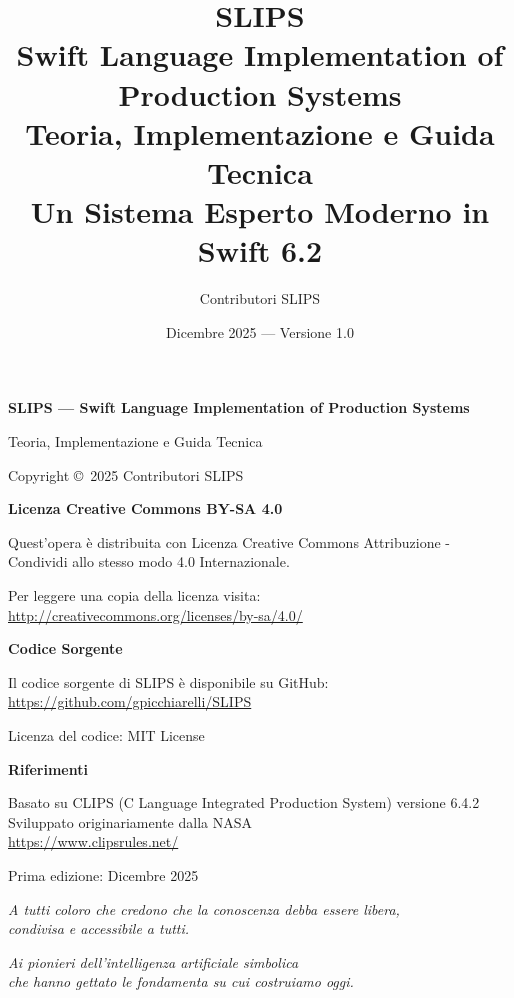 \documentclass[12pt,a4paper,twoside,openright]{book}
\title{%
  {\Huge\textbf{SLIPS}}\\[0.5cm]
  {\Large Swift Language Implementation of Production Systems}\\[1cm]
  {\large Teoria, Implementazione e Guida Tecnica}\\[0.5cm]
  {\large Un Sistema Esperto Moderno in Swift 6.2}
}
\author{Contributori SLIPS}
\date{Dicembre 2025 --- Versione 1.0}
\theoremstyle{definition}
\theoremstyle{remark}
\begin{document}
\frontmatter
\maketitle

\cleardoublepage
\thispagestyle{empty}
\vspace*{\fill}
\begin{center}
\begin{minipage}{0.8\textwidth}
\small

\textbf{SLIPS --- Swift Language Implementation of Production Systems}

Teoria, Implementazione e Guida Tecnica

\bigskip

Copyright \copyright\ 2025 Contributori SLIPS

\bigskip

\textbf{Licenza Creative Commons BY-SA 4.0}

Quest'opera è distribuita con Licenza Creative Commons Attribuzione - Condividi allo stesso modo 4.0 Internazionale.

Per leggere una copia della licenza visita:\\
\url{http://creativecommons.org/licenses/by-sa/4.0/}

\bigskip

\textbf{Codice Sorgente}

Il codice sorgente di SLIPS è disponibile su GitHub:\\
\url{https://github.com/gpicchiarelli/SLIPS}

Licenza del codice: MIT License

\bigskip

\textbf{Riferimenti}

Basato su CLIPS (C Language Integrated Production System) versione 6.4.2\\
Sviluppato originariamente dalla NASA\\
\url{https://www.clipsrules.net/}

\bigskip

Prima edizione: Dicembre 2025

\end{minipage}
\end{center}
\vspace*{\fill}

\cleardoublepage
\thispagestyle{empty}
\vspace*{\fill}
\begin{center}
\textit{A tutti coloro che credono che la conoscenza debba essere libera,\\
condivisa e accessibile a tutti.}

\bigskip

\textit{Ai pionieri dell'intelligenza artificiale simbolica\\
che hanno gettato le fondamenta su cui costruiamo oggi.}
\end{center}
\vspace*{\fill}
\end{document}
